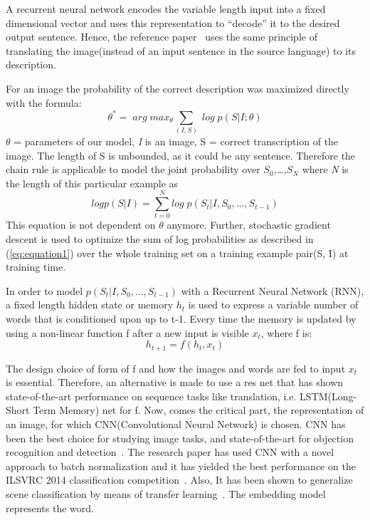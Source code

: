 \documentclass[a4paper,UKenglish,cleveref, autoref, thm-restate]{lipics-v2021}
\begin{document}
A recurrent neural network encodes the variable length input into a fixed dimensional vector and uses this representation to “decode” it to the desired output sentence. Hence, the reference paper~\cite{NIC} uses the same principle of translating the image(instead of an input sentence in the source language) to its description.

For an image the probability of the correct description was maximized directly with the formula:
\[ \theta^{*} =\;  arg\; max_{\theta} \sum_{(I,S)}\; log\; p(S|I; \theta) \label{eq:equation1} \tag{1} \]
 $\theta$ = parameters of our model,
\textit{I} is an image,
S = correct transcription of the image.
The length of S is unbounded, as it could be any sentence.
Therefore the chain rule is applicable to model the joint probability over \textit{$S_{0}$,\ldots,$S_{N}$} where \textit{N} is the length of this particular example as
\[ log p(S|I) = \sum_{t=0}^{N}log\; p(S_{t}|I,S_{0},...,S_{t-1}) \label{eq:equation2} \tag{2} \]
This equation is not dependent on $\theta$ anymore.
Further, stochastic gradient descent is used to optimize the sum of log probabilities as described in (\ref{eq:equation1}) over the whole training set on a training example pair(S, I) at training time.

 In order to model $p(S_{t}|I, S_{0},..., S_{t-1})$  with a Recurrent Neural Network (RNN), a fixed length hidden state or memory $h_{t}$ is used to express a variable number of words that is conditioned upon up to t-1. Every time the memory is updated by using a non-linear function f after a new input is visible $x_{t}$, where f is:
 \[
 h_{t+1} = f(h_{t}, x_{t}) \label{eq:equation3} \tag{3} \]

The design choice of form of f and how the images and words are fed to input $x_{t}$ is essential. Therefore, an alternative is made to use a res net that has shown state-of-the-art performance on sequence tasks like translation, i.e. LSTM(Long-Short Term Memory) net for f.
Now, comes the critical part, the representation of an image, for which CNN(Convolutional Neural Network) is chosen.
CNN has been the best choice for studying image tasks, and state-of-the-art for objection recognition and detection~\cite{NIC}.
The research paper has used CNN with a novel approach to batch normalization and it has yielded the best performance on the ILSVRC 2014 classification competition~\cite{12}. Also, It has been shown to generalize scene classification by means of transfer learning~\cite{4}. The embedding model represents the word.
\end{document}

